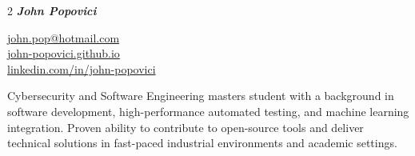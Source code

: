 \documentclass[a4paper,11pt]{article}
\begin{document}
\begin{multicols}{2}
\textbf{\Huge\textit{\textcolor{customBlue}{John Popovici}}}
\columnbreak

\raggedleft
\href{mailto:john.pop@hotmail.com}{john.pop@hotmail.com}\\
\href{https://john-popovici.github.io/}{john-popovici.github.io}\\
\href{https://www.linkedin.com/in/john-popovici/}{linkedin.com/in/john-popovici}\\
\end{multicols}
\vspace{-5pt}


Cybersecurity and Software Engineering masters student with a background in software development, high-performance automated testing, and machine learning integration. Proven ability to contribute to open-source tools and deliver technical solutions in fast-paced industrial environments and academic settings.

\end{document}
